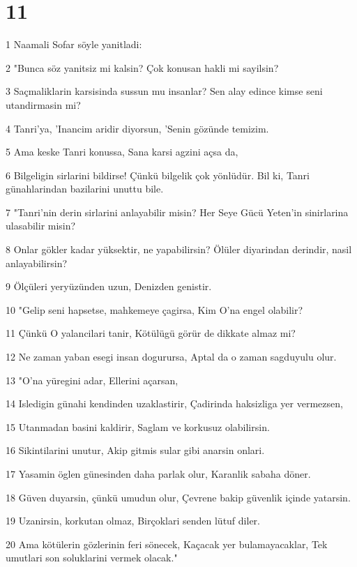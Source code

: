 \chapter{11}

\par 1 Naamali Sofar söyle yanitladi:
\par 2 "Bunca söz yanitsiz mi kalsin? Çok konusan hakli mi sayilsin?
\par 3 Saçmaliklarin karsisinda sussun mu insanlar? Sen alay edince kimse seni utandirmasin mi?
\par 4 Tanri'ya, 'Inancim aridir diyorsun, 'Senin gözünde temizim.
\par 5 Ama keske Tanri konussa, Sana karsi agzini açsa da,
\par 6 Bilgeligin sirlarini bildirse! Çünkü bilgelik çok yönlüdür. Bil ki, Tanri günahlarindan bazilarini unuttu bile.
\par 7 "Tanri'nin derin sirlarini anlayabilir misin? Her Seye Gücü Yeten'in sinirlarina ulasabilir misin?
\par 8 Onlar gökler kadar yüksektir, ne yapabilirsin? Ölüler diyarindan derindir, nasil anlayabilirsin?
\par 9 Ölçüleri yeryüzünden uzun, Denizden genistir.
\par 10 "Gelip seni hapsetse, mahkemeye çagirsa, Kim O'na engel olabilir?
\par 11 Çünkü O yalancilari tanir, Kötülügü görür de dikkate almaz mi?
\par 12 Ne zaman yaban esegi insan dogurursa, Aptal da o zaman sagduyulu olur.
\par 13 "O'na yüregini adar, Ellerini açarsan,
\par 14 Isledigin günahi kendinden uzaklastirir, Çadirinda haksizliga yer vermezsen,
\par 15 Utanmadan basini kaldirir, Saglam ve korkusuz olabilirsin.
\par 16 Sikintilarini unutur, Akip gitmis sular gibi anarsin onlari.
\par 17 Yasamin öglen günesinden daha parlak olur, Karanlik sabaha döner.
\par 18 Güven duyarsin, çünkü umudun olur, Çevrene bakip güvenlik içinde yatarsin.
\par 19 Uzanirsin, korkutan olmaz, Birçoklari senden lütuf diler.
\par 20 Ama kötülerin gözlerinin feri sönecek, Kaçacak yer bulamayacaklar, Tek umutlari son soluklarini vermek olacak."

